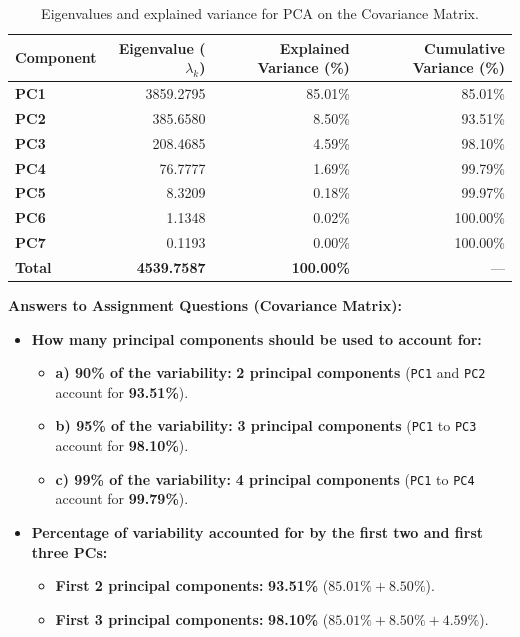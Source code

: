 \documentclass[11pt,a4paper]{article}
\begin{document}
\begin{table}[H]
\centering
\caption{Eigenvalues and explained variance for PCA on the Covariance Matrix.}
\label{tab:cov_eigen}
\begin{tabular}{lrrr}
\toprule
\textbf{Component} & \textbf{Eigenvalue ($\lambda_k$)} & \textbf{Explained Variance (\%)} & \textbf{Cumulative Variance (\%)} \\
\midrule
\textbf{PC1} & 3859.2795 & 85.01\% &  85.01\% \\
\textbf{PC2} &  385.6580 &  8.50\% &  93.51\% \\
\textbf{PC3} &  208.4685 &  4.59\% &  98.10\% \\
\textbf{PC4} &   76.7777 &  1.69\% &  99.79\% \\
\textbf{PC5} &    8.3209 &  0.18\% &  99.97\% \\
\textbf{PC6} &    1.1348 &  0.02\% & 100.00\% \\
\textbf{PC7} &    0.1193 &  0.00\% & 100.00\% \\
\midrule
\textbf{Total} & \textbf{4539.7587} & \textbf{100.00\%} & --- \\
\bottomrule
\end{tabular}
\end{table}

\noindent
\textbf{Answers to Assignment Questions (Covariance Matrix):}
\begin{itemize}
    \item \textbf{How many principal components should be used to account for:}
    \begin{itemize}
        \item \textbf{a) 90\% of the variability:} \textbf{2 principal components} (\texttt{PC1} and \texttt{PC2} account for \textbf{93.51\%}).
        \item \textbf{b) 95\% of the variability:} \textbf{3 principal components} (\texttt{PC1} to \texttt{PC3} account for \textbf{98.10\%}).
        \item \textbf{c) 99\% of the variability:} \textbf{4 principal components} (\texttt{PC1} to \texttt{PC4} account for \textbf{99.79\%}).
    \end{itemize}
    \item \textbf{Percentage of variability accounted for by the first two and first three PCs:}
    \begin{itemize}
        \item \textbf{First 2 principal components:} \textbf{93.51\%} ($85.01\% + 8.50\%$).
        \item \textbf{First 3 principal components:} \textbf{98.10\%} ($85.01\% + 8.50\% + 4.59\%$).
    \end{itemize}
\end{itemize}
\end{document}
